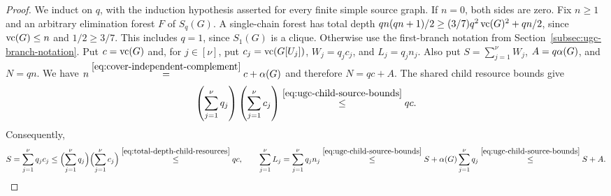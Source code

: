 \begin{proof}
We induct on $q$, with the induction hypothesis asserted for every
finite simple source graph. If $n=0$, both sides are zero. Fix
$n\geq1$ and an arbitrary elimination forest $F$ of $S_q(G)$.
A single-chain forest has total depth
$qn(qn+1)/2\ge(3/7)q^2\operatorname{vc}(G)^2+qn/2$, since $\operatorname{vc}(G)\le n$ and
$1/2\ge3/7$. This includes $q=1$, since $S_1(G)$ is a clique.
Otherwise use the first-branch notation
from Section~\ref{subsec:ugc-branch-notation}. Put $c=\operatorname{vc}(G)$ and,
for $j\in[\nu]$, put $c_j=\operatorname{vc}(G[U_j])$, $W_j=q_jc_j$, and $L_j=q_jn_j$.
Also put $S=\sum_{j=1}^{\nu} W_j$, $A=q\alpha(G)$, and $N=qn$.
We have $n\overset{\eqref{eq:cover-independent-complement}}{=}c+\alpha(G)$
and therefore $N=qc+A$. The shared child resource bounds give
\begin{equation}\label{eq:total-depth-child-resources}
 \left(\sum_{j=1}^{\nu}q_j\right)
 \left(\sum_{j=1}^{\nu}c_j\right)
 \overset{\eqref{eq:ugc-child-source-bounds}}{\leq}qc.
\end{equation}
Consequently,
\begin{equation}\label{eq:total-depth-support-bounds}
S=\sum_{j=1}^{\nu} q_jc_j
   \leq\Bigl(\sum_{j=1}^{\nu} q_j\Bigr)\Bigl(\sum_{j=1}^{\nu} c_j\Bigr)
   \overset{\eqref{eq:total-depth-child-resources}}{\leq}qc,\qquad \sum_{j=1}^{\nu} L_j=\sum_{j=1}^{\nu} q_jn_j
   \overset{\eqref{eq:ugc-child-source-bounds}}{\leq}
   S+\alpha(G)\sum_{j=1}^{\nu} q_j
   \overset{\eqref{eq:ugc-child-source-bounds}}{\leq}S+A.
\end{equation}


\end{proof}
